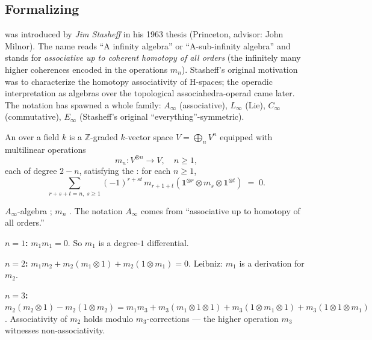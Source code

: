 \subsection{Formalizing}

\begin{nameorigin}
 was introduced by \emph{Jim Stasheff} in his
1963 thesis (Princeton, advisor: John Milnor). The name reads ``A
infinity algebra'' or ``A-sub-infinity algebra'' and stands for
\emph{associative up to coherent homotopy of all orders} (the
infinitely many higher coherences encoded in the operations $m_n$).
Stasheff's original motivation was to characterize the homotopy
associativity of H-spaces; the operadic interpretation as algebras over
the topological associahedra-operad came later. The notation has
spawned a whole family: $A_\infty$ (associative), $L_\infty$ (Lie),
$C_\infty$ (commutative), $E_\infty$ (Stasheff's original
``everything''-symmetric).
\end{nameorigin}

\begin{definition}
\label{def:Ainf-algebra}
An  over a field $k$ is a $\mathbb{Z}$-graded
$k$-vector space $V = \bigoplus_n V^n$ equipped with multilinear
operations
\begin{equation*}
  m_n : V^{\otimes n} \to V, \quad n \geq 1,
\end{equation*}
each of degree $2 - n$, satisfying the :
for each $n \geq 1$,
\begin{equation*}
  \sum_{r + s + t = n,\; s \geq 1} (-1)^{r + st}\, m_{r + 1 + t}(\mathbf{1}^{\otimes r} \otimes m_s \otimes \mathbf{1}^{\otimes t}) \;=\; 0.
\end{equation*}
\end{definition}

\begin{howtosay}
$A_\infty$-algebra ; $m_n$ .
The notation $A_\infty$ comes from ``associative up to homotopy of all
orders.''
\end{howtosay}

\begin{example_thm}
\label{ex:stasheff-low}
\textbf{$n = 1$:} $m_1 m_1 = 0$. So $m_1$ is a degree-$1$ differential.

\textbf{$n = 2$:} $m_1 m_2 + m_2(m_1 \otimes 1) + m_2(1 \otimes m_1) = 0$.
Leibniz: $m_1$ is a derivation for $m_2$.

\textbf{$n = 3$:} $m_2(m_2 \otimes 1) - m_2(1 \otimes m_2) = m_1 m_3 + m_3(m_1 \otimes 1 \otimes 1) + m_3(1 \otimes m_1 \otimes 1) + m_3(1 \otimes 1 \otimes m_1)$.
Associativity of $m_2$ holds modulo $m_3$-corrections — the higher
operation $m_3$ witnesses non-associativity.
\end{example_thm}

